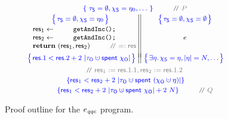 \begin{figure}[t]
  \centering
\[
{\small{
\!\!\!\!\!\!\!\!
\begin{array}{c}
  ~~~~~~~~\spec{~
  \tkns = \emptyset,
  \hists = \gist_0, \ldots
~} ~\comm{P}
\\[2pt]
  \begin{tabular}{c || c}
$
\spec{\!\!\!
    \begin{array}{c}
    \tkns = \emptyset,
    \hists = \gist_0
  \end{array}\!\!\!}
$
&
$
\spec{\!\!\!\begin{array}{c}
    \tkns = \emptyset,
    \hists = \emptyset
  \end{array}\!\!\!}
$
\\[3pt]
   $\begin{array}{l}
      \res_1 \Asgn \esc{getAndInc();}\\[1pt]
      \res_2 \Asgn \esc{getAndInc();}\\[1pt]
      \kw{return}~(\res_1, \res_2) ~\comm{ =: \res}\!\!\!
    \end{array}$
\!\!\!\!\!\!
& ${\small{e}}$ 
\\\\[-5pt] 
$
\spec{\!\!\!
{\small{
  \begin{array}{c}
    \res.1 < \res.2 + 2 \ |\tkno \hunion \Tomb~\histo|
  \end{array}
}}
  \!\!\!}\!\!$
\!\!
&
\!\!$\spec{\!\!\!
{{
  \begin{array}{c}
    \exists \gist \ldot 
    \hists = \gist, 
    |\gist| = N,
    \ldots
  \end{array}
}}
\!\!\!}$
\end{tabular}
\\\\[-5pt]
\comm{\res_1 := \res.1.1, \res_2 := \res.1.2}
\\\\[-6pt]
\spec{
\res_1 < \res_2 + 2 \ |\tkno \hunion \Tomb~(\histo \hunion \gist)|
}
\\[3pt]
~~~~~~~~\spec{
\res_1 < \res_2 + 2 \ |\tkno \hunion \Tomb~\histo| + 2 \ N
} ~\comm{Q}
%
\end{array}
}}  
\]
  \caption{Proof outline for the $e_{\mathit{qqc}}$ program.}
  \label{fig:eqqcproof}
\end{figure}

